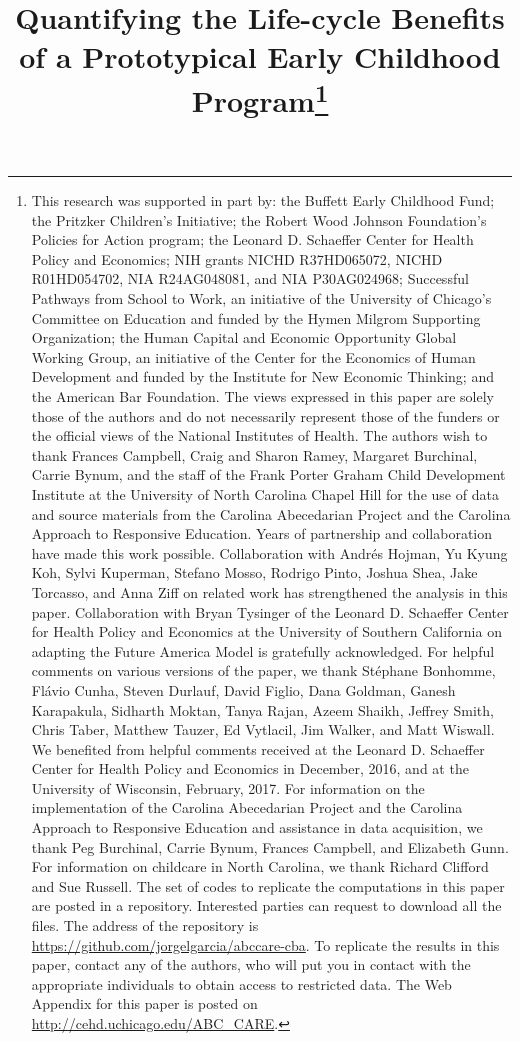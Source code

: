 \begin{titlepage}
\title{\Large \textbf{Quantifying the Life-cycle Benefits \\ of a Prototypical Early Childhood Program}\thanks{This research was supported in part by: the Buffett Early Childhood Fund; the Pritzker Children's Initiative; the Robert Wood Johnson Foundation's Policies for Action program; the Leonard D. Schaeffer Center for Health Policy and Economics; NIH grants NICHD R37HD065072, NICHD R01HD054702, NIA R24AG048081, and NIA P30AG024968; Successful Pathways from School to Work, an initiative of the University of Chicago's Committee on Education and funded by the Hymen Milgrom Supporting Organization; the Human Capital and Economic Opportunity Global Working Group, an initiative of the Center for the Economics of Human Development and funded by the Institute for New Economic Thinking; and the American Bar Foundation. The views expressed in this paper are solely those of the authors and do not necessarily represent those of the funders or the official views of the National Institutes of Health. The authors wish to thank Frances Campbell, Craig and Sharon Ramey, Margaret Burchinal, Carrie Bynum, and the staff of the Frank Porter Graham Child Development Institute at the University of North Carolina Chapel Hill for the use of data and source materials from the Carolina Abecedarian Project and the Carolina Approach to Responsive Education. Years of partnership and collaboration have made this work possible. Collaboration with Andr\'{e}s Hojman, Yu Kyung Koh, Sylvi Kuperman, Stefano Mosso, Rodrigo Pinto, Joshua Shea, Jake Torcasso, and Anna Ziff on related work has strengthened the analysis in this paper. Collaboration with Bryan Tysinger of the Leonard D. Schaeffer Center for Health Policy and Economics at the University of Southern California on adapting the Future America Model is gratefully acknowledged. For helpful comments on various versions of the paper, we thank St\'{e}phane Bonhomme, Fl\'{a}vio Cunha, Steven Durlauf, David Figlio, Dana Goldman, Ganesh Karapakula, Sidharth Moktan, Tanya Rajan, Azeem Shaikh, Jeffrey Smith, Chris Taber, Matthew Tauzer, Ed Vytlacil, Jim Walker, and Matt Wiswall. We benefited from helpful comments received at the Leonard D. Schaeffer Center for Health Policy and Economics in December, 2016, and at the University of Wisconsin, February, 2017. For information on the implementation of the Carolina Abecedarian Project and the Carolina Approach to Responsive Education and assistance in data acquisition, we thank Peg Burchinal, Carrie Bynum, Frances Campbell, and Elizabeth Gunn. For information on childcare in North Carolina, we thank Richard Clifford and Sue Russell. The set of codes to replicate the computations in this paper are posted in a repository. Interested parties can request to download all the files. The address of the repository is \url{https://github.com/jorgelgarcia/abccare-cba}. To replicate the results in this paper, contact any of the authors, who will put you in contact with the appropriate individuals to obtain access to restricted data. The Web Appendix for this paper is posted on \url{http://cehd.uchicago.edu/ABC_CARE}.}}


\end{titlepage}
